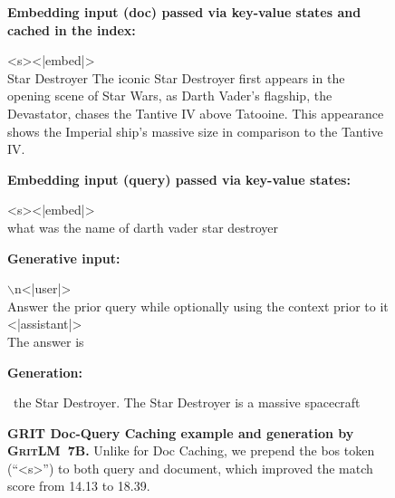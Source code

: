 \documentclass{article}
\newcommand{\modelbase}{\textsc{GritLM~7B}}
\newcommand{\method}{\textsc{GRIT}}
\begin{document}
\begin{figure}[htbp]
\hrulefill

\textbf{Embedding input (doc) passed via key-value states and cached in the index:}

\hrulefill

<s><|embed|>\\
Star Destroyer The iconic Star Destroyer first appears in the opening scene of Star Wars, as Darth Vader's flagship, the Devastator, chases the Tantive IV above Tatooine. This appearance shows the Imperial ship's massive size in comparison to the Tantive IV.

\hrulefill

\textbf{Embedding input (query) passed via key-value states:}

\hrulefill

<s><|embed|>\\
what was the name of darth vader star destroyer

\hrulefill

\textbf{Generative input:}

\hrulefill

$\backslash$n<|user|>\\
Answer the prior query while optionally using the context prior to it\\
<|assistant|>\\
The answer is

\hrulefill

\textbf{Generation:}

\hrulefill

~the Star Destroyer. The Star Destroyer is a massive spacecraft

\hrulefill

\caption{\textbf{\method{} Doc-Query Caching example and generation by \modelbase{}.} Unlike for Doc Caching, we prepend the bos token (``<s>'') to both query and document, which improved the match score from 14.13 to 18.39.}
\label{fig:ragdq}
\end{figure}

\FloatBarrier
\end{document}
